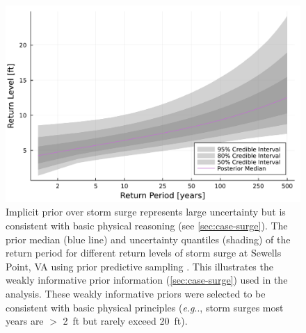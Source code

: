 \documentclass[ef,draft]{agutexSI2019}
\makeatletter
\DeclareRobustCommand\onedot{\futurelet\@let@token\@onedot}
\def\@onedot{\ifx\@let@token.\else.\null\fi\xspace}
\def\eg{\emph{e.g}\onedot} \def\Eg{\emph{E.g}\onedot}
\makeatother
\begin{document}
\begin{figure}
      \centering
      \includegraphics[width=\textwidth]{surge-prior-return}
      \caption{
            Implicit prior over storm surge represents large uncertainty but is consistent with basic physical reasoning (see \cref{sec:case-surge}).
            The prior median (blue line) and uncertainty quantiles (shading) of the return period for different return levels of storm surge at Sewells Point, VA using prior predictive sampling \cite{gelman_workflow:2020}.
            This illustrates the weakly informative prior information (\cref{sec:case-surge}) used in the analysis.
            These weakly informative priors were selected to be consistent with basic physical principles (\eg, storm surges most years are $>$ \SI{2}{ft} but rarely exceed \SI{20}{ft}).
      }\label{fig:surge-prior-return}
\end{figure}
\end{document}
